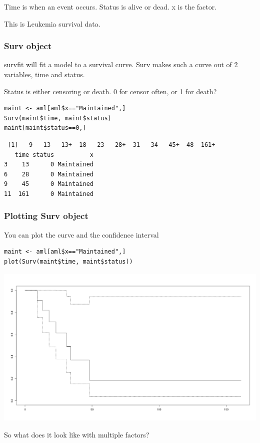 \documentclass[11pt]{article}
\begin{document}
Time is when an event occurs. Status is alive or dead. x is the factor.

This is Leukemia survival data.

\subsubsection{Surv object}
\label{sec:org0b7e58c}

survfit will fit a model to a survival curve. Surv makes such a curve out of 2 variables, time and status.

Status is either censoring or death. 0 for censor often, or 1 for death?

\begin{verbatim}
maint <- aml[aml$x=="Maintained",]
Surv(maint$time, maint$status)
maint[maint$status==0,]
\end{verbatim}

\begin{verbatim}
 [1]   9   13   13+  18   23   28+  31   34   45+  48  161+
   time status          x
3    13      0 Maintained
6    28      0 Maintained
9    45      0 Maintained
11  161      0 Maintained
\end{verbatim}

\subsubsection{Plotting Surv object}
\label{sec:orgca23d6c}

You can plot the curve and the confidence interval

\begin{verbatim}
maint <- aml[aml$x=="Maintained",]
plot(Surv(maint$time, maint$status))
\end{verbatim}

\begin{center}
\includegraphics[width=.9\linewidth]{Surv.png}
\end{center}
So what does it look like with multiple factors?
\end{document}

